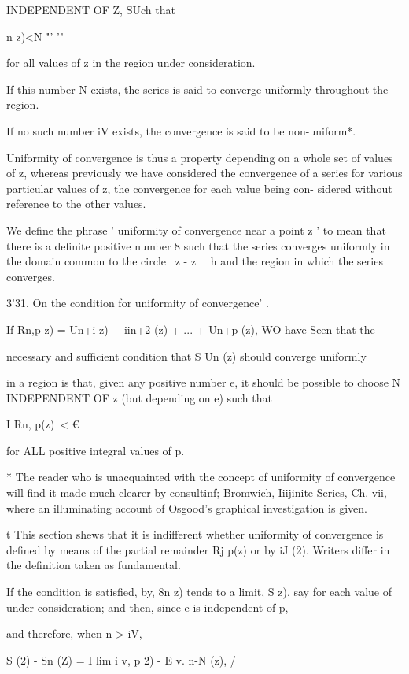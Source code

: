 INDEPENDENT OF Z, SUch that

n z)<N "' '"

for all values of z in the region under consideration.

If this number N exists, the series is said to converge uniformly
throughout the region.

If no such number iV exists, the convergence is said to be
non-uniform*.

Uniformity of convergence is thus a property depending on a whole set
of values of z, whereas previously we have considered the convergence
of a series for various particular values of z, the convergence for
each value being con- sidered without reference to the other values.

We define the phrase ' uniformity of convergence near a point z ' to
mean that there is a definite positive number 8 such that the series
converges uniformly in the domain common to the circle \ z - z \ \ h
and the region in which the series converges.

3'31. On the condition for uniformity of convergence' .

If Rn,p z) = Un+i z) + iin+2 (z) + ... + Un+p (z), WO have Seen that
the

necessary and sufficient condition that S Un (z) should converge
uniformly

in a region is that, given any positive number e, it should be
possible to choose N INDEPENDENT OF z (but depending on e) such that

I Rn, p(z)\ < €

for ALL positive integral values of p.

* The reader who is unacquainted with the concept of uniformity of
convergence will find it made much clearer by consultinf; Bromwich,
Iiijinite Series, Ch. vii, where an illuminating account of Osgood's
graphical investigation is given.

t This section shews that it is indifferent whether uniformity of
convergence is defined by means of the partial remainder Rj p(z) or by
iJ (2). Writers differ in the definition taken as fundamental.

%
%

If the condition is satisfied, by, 8n z) tends to a limit, S
z), say for each value of under consideration; and then, since e is
independent of p,

and therefore, when n > iV,

S (2) - Sn (Z) = I lim i v, p 2) - E v. n-N (z), /

